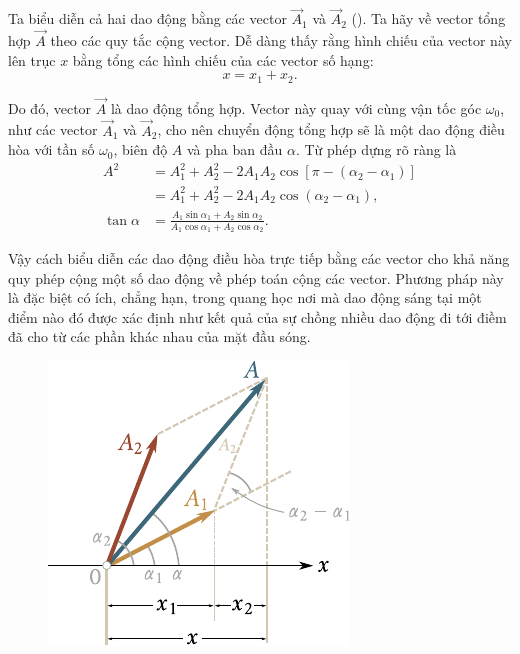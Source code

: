 \noindent
Ta biểu diễn cả hai dao động bằng các vector $\vec{A}_1$ và $\vec{A}_2$ (). Ta hãy về vector tổng hợp $\vec{A}$ theo các quy tắc cộng vector. Dễ dàng thấy rằng hình chiếu của vector này lên trục $x$ bằng tổng các hình chiếu của các vector số hạng:
\begin{equation*}
	x = x_1 + x_2.
\end{equation*}

\noindent
Do đó, vector $\vec{A}$ là dao động tổng hợp. Vector này quay với cùng vận tốc góc $\omega_0$, như các vector $\vec{A}_1$ và $\vec{A}_2$, cho nên chuyển động tổng hợp sẽ là một dao động điều hòa với tần số $\omega_0$, biên độ $A$ và pha ban đầu $\alpha$. Từ phép dựng rõ ràng là
\begin{align}
	A^2 &= A_1^2 + A_2^2 - 2A_1A_2\cos[\pi-(\alpha_2-\alpha_1)] \nonumber\\
	&= A_1^2 + A_2^2 - 2A_1A_2\cos(\alpha_2-\alpha_1), \label{eq:7_84}\\
	\tan\alpha &= \frac{A_1\sin\alpha_1 + A_2\sin\alpha_2}{A_1\cos\alpha_1 + A_2\cos\alpha_2}.\label{eq:7_85}
\end{align}

Vậy cách biểu diễn các dao động điều hòa trực tiếp bằng các vector cho khả năng quy phép cộng một số dao động về phép toán cộng các vector. Phương pháp này là đặc biệt có ích, chẳng hạn, trong quang học nơi mà dao động sáng tại một điểm nào đó được xác định như kết quả của sự chồng nhiều dao động đi tới điềm đã cho từ các phần khác nhau của mặt đầu sóng.

\begin{figure}[!htb]
	\begin{center}
		\includegraphics[scale=0.95]{figures/ch_07/fig_7_10.pdf}
		\caption[]{}
		\label{fig:7_10}
	\end{center}
\end{figure}


